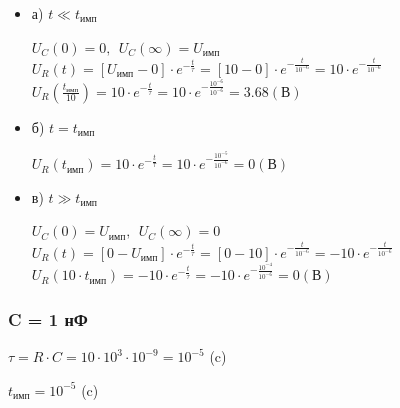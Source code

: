 \begin{itemize}
\item[] а) $t \ll t_\text{имп}$

		$U_C(0)	= 0,\ \ U_C(\infty) = U_\text{имп}$\\
		$U_R(t) = [U_\text{имп} - 0] \cdot e^{-\frac{t}{\tau}} = [10 - 0] \cdot e^{-\frac{t}{10^{-6}}} = 10 \cdot e^{-\frac{t}{10^{-6}}}$\\
		$U_R(\frac{t_\text{имп}}{10}) = 10 \cdot e^{-\frac{t}{\tau}} = 10 \cdot e^{-\frac{10^{-6}}{10^{-6}}} = 3.68 (\text{В})$\\

\item[] б) $t = t_\text{имп}$

		$U_R(t_\text{имп}) = 10 \cdot e^{-\frac{t}{\tau}} = 10 \cdot e^{-\frac{10^{-5}}{10^{-6}}} = 0 (\text{В})$\\
	
\item[] в) $t \gg t_\text{имп}$
		
		$U_C(0)	= U_\text{имп},\ \ U_C(\infty) = 0$\\		
		$U_R(t) = [0 - U_\text{имп}] \cdot e^{-\frac{t}{\tau}} = [0 - 10] \cdot e^{-\frac{t}{10^{-6}}} = -10 \cdot e^{-\frac{t}{10^{-6}}}$\\
		$U_R(10 \cdot t_\text{имп}) = -10 \cdot e^{-\frac{t}{\tau}} = -10 \cdot e^{-\frac{10^{-4}}{10^{-6}}} = 0 (\text{В})$\\
\end{itemize}

\subsubsection{C = 1 нФ}

		$\tau = R \cdot C = 10 \cdot 10^3 \cdot 10^{-9} = 10^{-5}$ (c)
		
		$t_\text{имп} = 10^{-5}$ (c)

